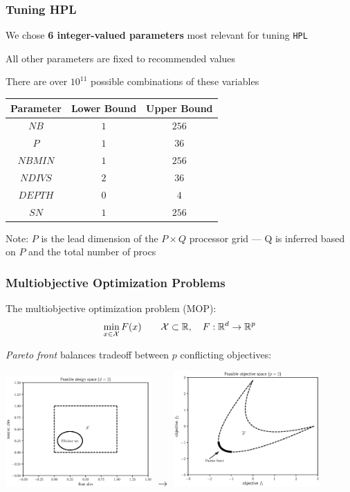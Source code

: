 \documentclass[aspectratio=169]{beamer}
\begin{document}
\begin{frame}\frametitle{Tuning HPL}
	We chose {\bf 6 integer-valued parameters} most relevant for tuning
	\texttt{HPL}

	\medskip

	All other parameters are fixed to recommended values

	\medskip

	There  are  over  $10^{11}$ possible combinations of these variables 

	\bigskip
\begin{center}
\begin{tabular}{c|cc}
    \textbf{Parameter} & \textbf{Lower Bound} & \textbf{Upper Bound} \\
    \hline
    $NB$ & $1$ & $256$\\
    $P$ & $1$ & $36$ \\
    $NBMIN$ & $1$ & $256$ \\
    $NDIVS$ & $2$ & $36$ \\
    $DEPTH$ & $0$ & $4$ \\
    $SN$ & $1$ & $256$ \\
\end{tabular}
\end{center}

\bigskip

	{\small Note: $P$ is the lead dimension of the $P\times Q$ processor
	grid --- Q is inferred based on $P$ and the total number of procs}
\end{frame}

\begin{frame}\frametitle{Multiobjective Optimization Problems}
	The multiobjective optimization problem (MOP):
	$$
		\min_{x\in{\cal X}} F(x) \qquad {\cal X} \subset \mathbb{R},
		\quad F : \mathbb{R}^d \rightarrow \mathbb{R}^p
	$$

	\smallskip

	{\it Pareto front} balances tradeoff between $p$ conflicting
	objectives:\\
	\begin{center}
		\includegraphics[width=0.42\textwidth]{feasible_design.eps}
		$\rightarrow$
		\includegraphics[width=0.42\textwidth]{convex_pareto.eps}
	\end{center}
\end{frame}
\end{document}
